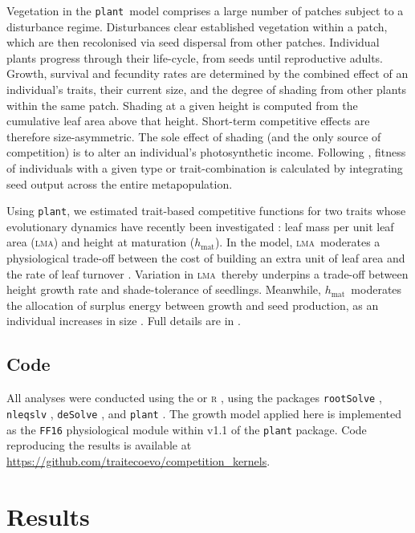 \documentclass[a4paper,11pt]{article}
\newcommand{\plant}{{\tt plant}}
\newcommand{\hmat}{\ensuremath{h_{\text{mat}}}}
\newcommand{\lma}{\textsc{lma}}
\begin{document}
Vegetation in the \plant\ model comprises a large number of patches subject to a disturbance regime. Disturbances clear established vegetation within a patch, which are then recolonised via seed dispersal from other patches. Individual plants progress through their life-cycle, from seeds until reproductive adults. Growth, survival and fecundity rates are determined by the combined effect of an individual's traits, their current size, and the degree of shading from other plants within the same patch. Shading at a given height is computed from the cumulative leaf area above that height. Short-term competitive effects are therefore size-asymmetric. The sole effect of shading (and the only source of competition) is to alter an individual's photosynthetic income. Following \citet{Falster-2017}, fitness of individuals with a given type or trait-combination is calculated by integrating seed output across the entire metapopulation. 

Using \plant, we estimated trait-based competitive functions for two traits whose evolutionary dynamics have recently been investigated \citep{Falster-2017}: leaf mass per unit leaf area (\lma) and height at maturation (\hmat). In the model, \lma\ moderates a physiological trade-off between the cost of building an extra unit of leaf area and the rate of leaf turnover \citep{Wright-2004}. Variation in \lma\ thereby underpins a trade-off between height growth rate and shade-tolerance of seedlings. Meanwhile, \hmat\ moderates the allocation of surplus energy between growth and seed production, as an individual increases in size \citep{Falster-2017}. Full details are in \citet{Falster-2016, Falster-2017}.

\subsection{Code}

All analyses were conducted using the or \textsc{r} \citep{R-2021}, using the packages 
{\tt rootSolve} \citep{Soetaert-2009}, 
{\tt nleqslv} \citep{Hasselman-2008}, 
{\tt deSolve} \citep{Soetaert-2010}, and
{\tt plant} \citep{Falster-2016, Falster-2018}. The growth model applied here is implemented as the \texttt{FF16} physiological module within v1.1 of the {\plant} package. 
Code reproducing the results is available at \href{https://github.com/traitecoevo/competition_kernels}{https://github.com/traitecoevo/competition\_kernels}.

\section{Results}
\end{document}
